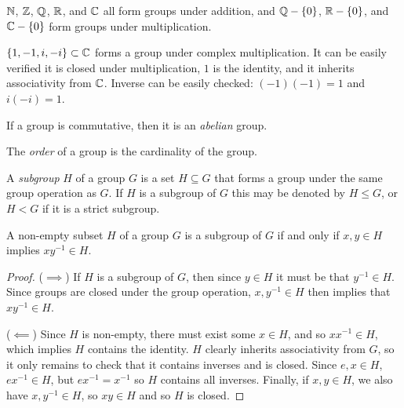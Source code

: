 \begin{exmp}
    $\mathbb{N}$, $\mathbb{Z}$, $\mathbb{Q}$, $\mathbb{R}$, and $\mathbb{C}$ all form groups under addition, and $\mathbb{Q} - \{0\}$, $\mathbb{R} - \{0\}$, and $\mathbb{C} - \{0\}$ form groups under multiplication.
\end{exmp}

\begin{exmp}
    $\{1, -1, i, -i\} \subset \mathbb{C}$ forms a group under complex multiplication. It can be easily verified it is closed under multiplication, $1$ is the identity, and it inherits associativity from $\mathbb{C}$. Inverse can be easily checked: $(-1)(-1) = 1$ and $i(-i) = 1$.
\end{exmp}

\begin{defn}
    If a group is commutative, then it is an \emph{abelian} group.
\end{defn}

\begin{defn}
    The \emph{order} of a group is the cardinality of the group.
\end{defn}

\begin{defn}
    A \emph{subgroup} $H$ of a group $G$ is a set $H \subseteq G$ that forms a group under the same group operation as $G$. If $H$ is a subgroup of $G$ this may be denoted by $H \leqslant G$, or $H < G$ if it is a strict subgroup.
\end{defn}

\begin{thm}\label{subgroup-test}
    A non-empty subset $H$ of a group $G$ is a subgroup of $G$ if and only if $x, y \in H$ implies $xy^{-1} \in H$.
\end{thm}

\begin{proof}\proofbreak
    ($\implies$) If $H$ is a subgroup of $G$, then since $y \in H$ it must be that $y^{-1} \in H$. Since groups are closed under the group operation, $x, y^{-1} \in H$ then implies that $xy^{-1} \in H$.

    ($\impliedby$) Since $H$ is non-empty, there must exist some $x \in H$, and so $xx^{-1} \in H$, which implies $H$ contains the identity. $H$ clearly inherits associativity from $G$, so it only remains to check that it contains inverses and is closed. Since $e, x \in H$, $ex^{-1} \in H$, but $ex^{-1} = x^{-1}$ so $H$ contains all inverses. Finally, if $x, y \in H$, we also have $x, y^{-1} \in H$, so $xy \in H$ and so $H$ is closed.
\end{proof}

